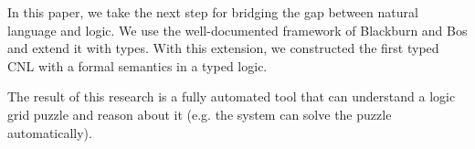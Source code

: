 

In this paper, we take the next step for bridging the gap between natural language and logic. We use the well-documented framework of Blackburn and Bos and extend it with types. With this extension, we constructed the first typed CNL with a formal semantics in a typed logic.

The result of this research is a fully automated tool that can understand a logic grid puzzle and reason about it (e.g. the system can solve the puzzle automatically).

